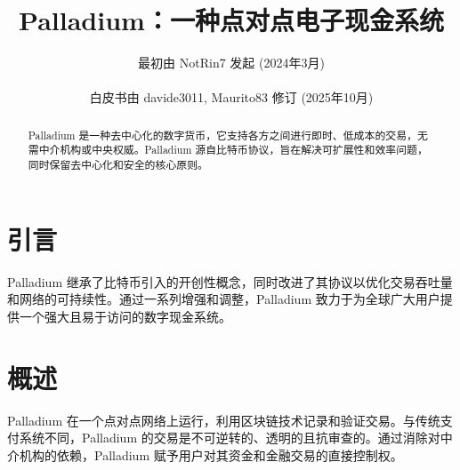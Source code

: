\documentclass[11pt,a4paper]{article}
\title{\textbf{Palladium：一种点对点电子现金系统}}
\author{最初由 NotRin7 发起 (2024年3月) \\\\ 白皮书由 davide3011, Maurito83 修订 (2025年10月)}
\date{}
\begin{document}
\maketitle

\begin{abstract}
Palladium 是一种去中心化的数字货币，它支持各方之间进行即时、低成本的交易，无需中介机构或中央权威。Palladium 源自比特币协议，旨在解决可扩展性和效率问题，同时保留去中心化和安全的核心原则。
\end{abstract}

\section{引言}
Palladium 继承了比特币引入的开创性概念，同时改进了其协议以优化交易吞吐量和网络的可持续性。通过一系列增强和调整，Palladium 致力于为全球广大用户提供一个强大且易于访问的数字现金系统。

\section{概述}
Palladium 在一个点对点网络上运行，利用区块链技术记录和验证交易。与传统支付系统不同，Palladium 的交易是不可逆转的、透明的且抗审查的。通过消除对中介机构的依赖，Palladium 赋予用户对其资金和金融交易的直接控制权。
\end{document}

